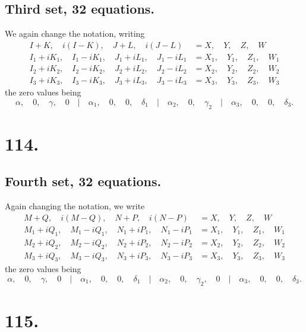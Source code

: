 \documentclass[11pt,a4paper]{book}
\begin{document}
\subsection*{Third set, 32 equations.}

We again change the notation, writing
\begin{align*}
I+K, \quad i(I-K), \quad J+L, \quad i(J-L) &= X, \quad Y, \quad Z, \quad W \\
I_1+iK_1, \quad I_1-iK_1, \quad J_1+iL_1, \quad J_1-iL_1 &= X_1, \quad Y_1, \quad Z_1, \quad W_1 \\
I_2+iK_2, \quad I_2-iK_2, \quad J_2+iL_2, \quad J_2-iL_2 &= X_2, \quad Y_2, \quad Z_2, \quad W_2 \\
I_3+iK_3, \quad I_3-iK_3, \quad J_3+iL_3, \quad J_3-iL_3 &= X_3, \quad Y_3, \quad Z_3, \quad W_3
\end{align*}
the zero values being
\[
\alpha, \quad 0, \quad \gamma, \quad 0 \quad|\quad \alpha_1, \quad 0, \quad 0, \quad \delta_1 \quad|\quad \alpha_2, \quad 0, \quad \gamma_2 \quad|\quad \alpha_3, \quad 0, \quad 0, \quad \delta_3.
\]

\newpage
\section*{114.}
\label{sec:114}

\subsection*{Fourth set, 32 equations.}

Again changing the notation, we write
\begin{align*}
M+Q, \quad i(M-Q), \quad N+P, \quad i(N-P) &= X, \quad Y, \quad Z, \quad W \\
M_1+iQ_1, \quad M_1-iQ_1, \quad N_1+iP_1, \quad N_1-iP_1 &= X_1, \quad Y_1, \quad Z_1, \quad W_1 \\
M_2+iQ_2, \quad M_2-iQ_2, \quad N_2+iP_2, \quad N_2-iP_2 &= X_2, \quad Y_2, \quad Z_2, \quad W_2 \\
M_3+iQ_3, \quad M_3-iQ_3, \quad N_3+iP_3, \quad N_3-iP_3 &= X_3, \quad Y_3, \quad Z_3, \quad W_3
\end{align*}
the zero values being
\[
\alpha, \quad 0, \quad \gamma, \quad 0 \quad|\quad \alpha_1, \quad 0, \quad 0, \quad \delta_1 \quad|\quad \alpha_2, \quad 0, \quad \gamma_2, \quad 0 \quad|\quad \alpha_3, \quad 0, \quad 0, \quad \delta_3.
\]

\newpage
\section*{115.}
\label{sec:115}
\end{document}

